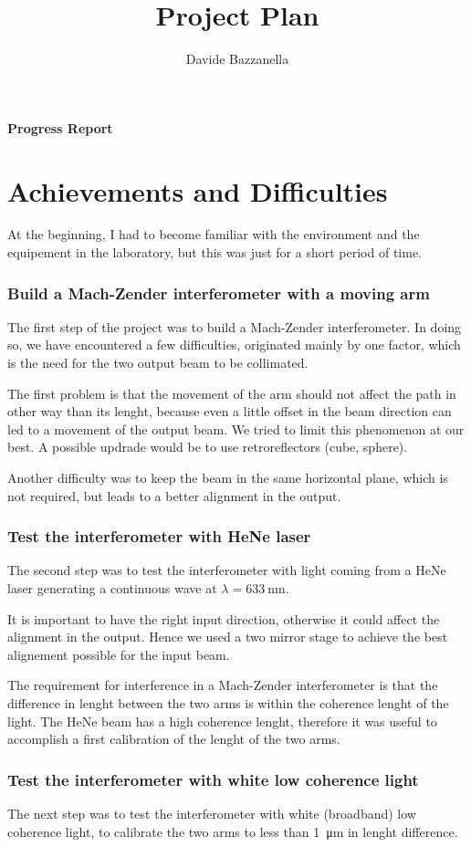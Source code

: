 \documentclass[12pt,a4paper]{report}
\author{Davide Bazzanella}
\title{Project Plan}
\begin{document}
\textbf{\Huge{Progress Report}}
\section*{Achievements and Difficulties}
At the beginning, I had to become familiar with the environment and the equipement in the laboratory, but this was just for a short period of time.
\subsubsection*{Build a Mach-Zender interferometer with a moving arm}
The first step of the project was to build a Mach-Zender interferometer.
In doing so, we have encountered a few difficulties, originated mainly by one factor, which is the need for the two output beam to be collimated.

The first problem is that the movement of the arm should not affect the path in other way than its lenght, because even a little offset in the beam direction can led to a movement of the output beam.
We tried to limit this phenomenon at our best.
A possible updrade would be to use retroreflectors (cube, sphere).

Another difficulty was to keep the beam in the same horizontal plane, which is not required, but leads to a better alignment in the output.

\subsubsection*{Test the interferometer with HeNe laser}
The second step was to test the interferometer with light coming from a HeNe laser generating a continuous wave at $\lambda = \SI{633}{\nm}$.

It is important to have the right input direction, otherwise it could affect the alignment in the output.
Hence we used a two mirror stage to achieve the best alignement possible for the input beam.

The requirement for interference in a Mach-Zender interferometer is that the difference in lenght between the two arms is within the coherence lenght of the light.
The HeNe beam has a high coherence lenght, therefore it was useful to accomplish a first calibration of the lenght of the two arms.

\subsubsection*{Test the interferometer with white low coherence light}
The next step was to test the interferometer with white (broadband) low coherence light, to calibrate the two arms to less than \SI{1}{\um} in lenght difference.
\end{document}
